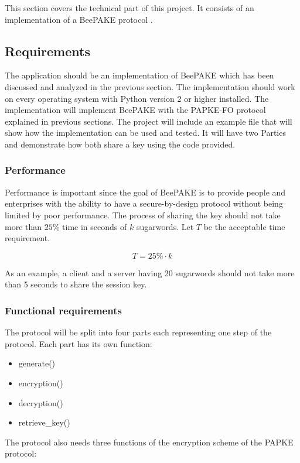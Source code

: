 \documentclass[../main.tex]{subfiles}
\begin{document}
This section covers the technical part of this project. It consists of an
implementation of a BeePAKE protocol \cite{marjan2023}. 

\subsection{Requirements}
The application should be an implementation of BeePAKE \cite{marjan2023} which
has been discussed and analyzed in the previous section. The implementation
should work on every operating system with Python version 2 or higher
installed. The implementation will implement BeePAKE with the PAPKE-FO
\cite{bradley2019password} protocol explained in previous sections. The project
will include an example file that will show how the implementation can be used
and tested. It will have two Parties and demonstrate how both share a key using
the code provided.

\subsubsection{Performance}
Performance is important since the goal of BeePAKE is to provide people and 
enterprises with the ability to have a secure-by-design protocol without being
limited by poor performance. The process of sharing the key should not take more 
than \(25\%\) time in seconds of \(k\) sugarwords. Let \(T\) be the acceptable time
requirement. 

\[T = 25\% \cdot k\]

As an example, a client and a server having 20 sugarwords should not take more than
5 seconds to share the session key.

\subsubsection{Functional requirements} 
The protocol will be split into four parts each representing one step of the
protocol. Each part has its own function:

\begin{itemize}
	\item generate()
	\item encryption()
	\item decryption()
	\item retrieve\_key()
\end{itemize}

The protocol also needs three functions of the encryption scheme of the PAPKE protocol:
\end{document}
